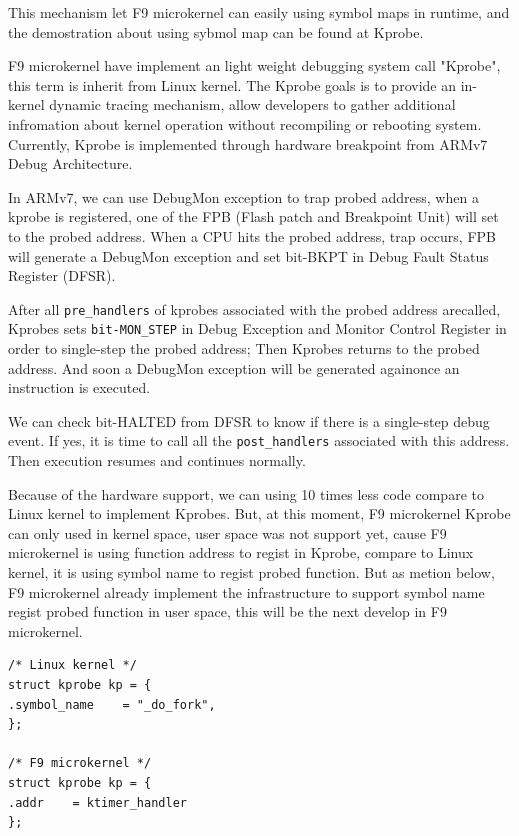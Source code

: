 \documentclass[10pt,preprint,nocopyrightspace]{sigplanconf}
\begin{document}
This mechanism let F9 microkernel can easily using symbol maps in runtime, and the demostration about using sybmol map can be found at Kprobe.

F9 microkernel have implement an light weight debugging system call "Kprobe", this term is inherit from Linux kernel. The Kprobe goals is to provide an in-kernel dynamic tracing mechanism, allow developers to gather additional infromation about kernel operation without recompiling or rebooting system. Currently, Kprobe is implemented through hardware breakpoint from ARMv7 Debug Architecture. 

In ARMv7, we can use DebugMon exception to trap probed address\cite{yiu2013definitive}, when a kprobe is registered, one of the FPB (Flash patch and Breakpoint Unit) will set to the probed address. When a CPU hits the probed address, trap occurs, FPB will generate a DebugMon exception and set bit-BKPT in Debug Fault Status Register (DFSR).

After all \texttt{pre\_handlers} of kprobes associated with the probed address arecalled, Kprobes sets \texttt{bit-MON\_STEP} in Debug Exception and Monitor Control Register in order to single-step the probed address; Then Kprobes returns to
the probed address. And soon a DebugMon exception will be generated againonce an instruction is executed.

We can check bit-HALTED from DFSR to know if there is a single-step debug event. If yes, it is time to call all the \texttt{post\_handlers} associated with this address. Then execution resumes and continues normally.

Because of the hardware support, we can using 10 times less code compare to Linux kernel to implement Kprobes. But, at this moment, F9 microkernel Kprobe can only used in kernel space, user space was not support yet, cause F9 microkernel is using function address to regist in Kprobe, compare to Linux kernel, it is using symbol name to regist 
probed function. But as metion below, F9 microkernel already implement the infrastructure to support symbol name regist probed function in user space, this will be the next develop in F9 microkernel.

\begin{lstlisting}[basicstyle=\small,frame=single]
/* Linux kernel */
struct kprobe kp = {
.symbol_name    = "_do_fork",
};

/* F9 microkernel */
struct kprobe kp = {
.addr    = ktimer_handler
};

\end{lstlisting}
\end{document}
